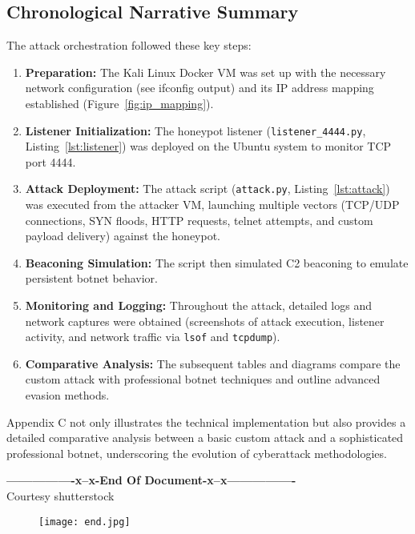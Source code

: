 \documentclass{article}
\begin{document}
\subsection*{Chronological Narrative Summary}
The attack orchestration followed these key steps:
\begin{enumerate}
    \item \textbf{Preparation:} The Kali Linux Docker VM was set up with the necessary network configuration (see ifconfig output) and its IP address mapping established (Figure~\ref{fig:ip_mapping}).
    \item \textbf{Listener Initialization:} The honeypot listener (\texttt{listener\_4444.py}, Listing~\ref{lst:listener}) was deployed on the Ubuntu system to monitor TCP port 4444.
    \item \textbf{Attack Deployment:} The attack script (\texttt{attack.py}, Listing~\ref{lst:attack}) was executed from the attacker VM, launching multiple vectors (TCP/UDP connections, SYN floods, HTTP requests, telnet attempts, and custom payload delivery) against the honeypot.
    \item \textbf{Beaconing Simulation:} The script then simulated C2 beaconing to emulate persistent botnet behavior.
    \item \textbf{Monitoring and Logging:} Throughout the attack, detailed logs and network captures were obtained (screenshots of attack execution, listener activity, and network traffic via \texttt{lsof} and \texttt{tcpdump}).
    \item \textbf{Comparative Analysis:} The subsequent tables and diagrams compare the custom attack with professional botnet techniques and outline advanced evasion methods.
\end{enumerate}

Appendix C not only illustrates the technical implementation but also provides a detailed comparative analysis between a basic custom attack and a sophisticated professional botnet, underscoring the evolution of cyberattack methodologies.


\clearpage
\nocite{*}
\printbibliography[heading=bibintoc,title={References}]
\centering
\textbf{—-------------x--x-End Of Document-x--x—-------------}\\
\tiny Courtesy shutterstock
\begin{figure}[h!]
    \centering
    \texttt{[image: end.jpg]}
\end{figure}
\end{document}
